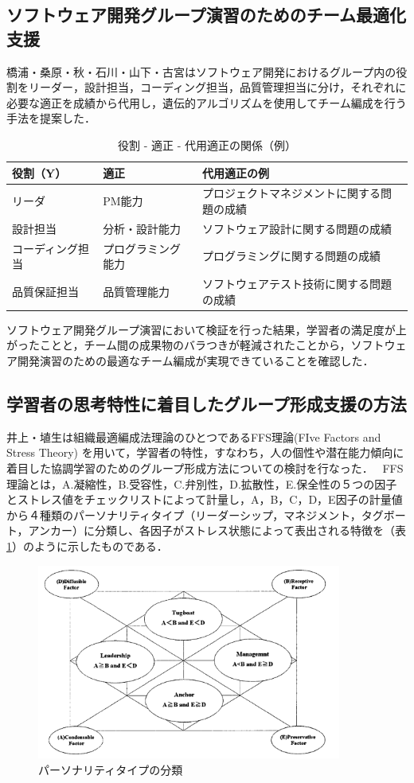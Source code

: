 \documentclass{funthesis}
\begin{document}
\subsection{ソフトウェア開発グループ演習のためのチーム最適化支援}
橋浦・桑原・秋・石川・山下・古宮\cite{A6}はソフトウェア開発におけるグループ内の役割をリーダー，設計担当，コーディング担当，品質管理担当に分け，それぞれに必要な適正を成績から代用し，遺伝的アルゴリズムを使用してチーム編成を行う手法を提案した．
\begin{table}[h]
\begin{center}
  \begin{tabular}{lll} \hline
    役割（Y） & 適正 & 代用適正の例\tabularnewline \hline
    リーダ & PM能力 & プロジェクトマネジメントに関する問題の成績\tabularnewline
    設計担当 &分析・設計能力 & 
    ソフトウェア設計に関する問題の成績\tabularnewline
    コーディング担当&プログラミング能力 &
    プログラミングに関する問題の成績\tabularnewline
    品質保証担当&品質管理能力 &
    ソフトウェアテスト技術に関する問題の成績\tabularnewline
    \hline
  \end{tabular}
  \caption{役割 - 適正 - 代用適正の関係（例）}
  \label{適正}
  \end{center}
\end{table}
ソフトウェア開発グループ演習において検証を行った結果，学習者の満足度が上がったことと，チーム間の成果物のバラつきが軽減されたことから，ソフトウェア開発演習のための最適なチーム編成が実現できていることを確認した．


\subsection{学習者の思考特性に着目したグループ形成支援の方法}
井上・埴生は\cite{A7}組織最適編成法理論のひとつであるFFS理論(FIve Factors and Stress Theory)
\cite{A8}を用いて，学習者の特性，すなわち，人の個性や潜在能力傾向に着目した協調学習のためのグループ形成方法についての検討を行なった．
\ FFS理論とは，A.凝縮性，B.受容性，C.弁別性，D.拡散性，E.保全性の５つの因子とストレス値をチェックリストによって計量し，A，B，C，D，E因子の計量値から４種類のパーソナリティタイプ（リーダーシップ，マネジメント，タグボート，アンカー）に分類し、各因子がストレス状態によって表出される特徴を（表\ref{FFS}）のように示したものである\cite{A9}．
\begin{figure}[h]
 \centering
   \includegraphics[width=100mm]{figures/FFS.png}
 \caption{パーソナリティタイプの分類}
 \label{FFS}
\end{figure}
\end{document}

